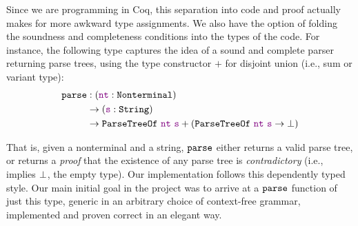     Since we are programming in Coq, this separation into code and proof actually makes for more awkward type assignments.  We also have the option of folding the soundness and completeness conditions into the types of the code.  For instance, the following type captures the idea of a sound and complete parser returning parse trees, using the type constructor $+$ for disjoint union (i.e., sum or variant type):
    \begin{align*}
      \fname{parse} & \oftypesep
      (\oftype{\farg{nt}}{\Nonterminal}) \\
      & \typeto (\oftype{\farg{s}}{\String}) \\
      & \typeto \indname{ParseTreeOf}~\farg{nt}~\farg{s} + (\indname{ParseTreeOf}~\farg{nt}~\farg{s} \typeto \False)
    \end{align*}

    That is, given a nonterminal and a string, $\texttt{parse}$ either returns a valid parse tree, or returns a \emph{proof} that the existence of any parse tree is \emph{contradictory} (i.e., implies $\bot$, the empty type).  Our implementation follows this dependently typed style.  Our main initial goal in the project was to arrive at a $\texttt{parse}$ function of just this type, generic in an arbitrary choice of context-free grammar, implemented and proven correct in an elegant way.
